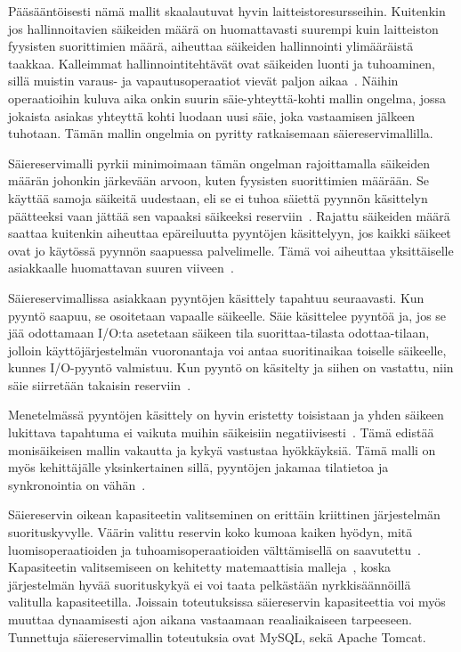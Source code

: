 \documentclass[finnish]{tktltiki2}
\theoremstyle{definition}
\theoremstyle{remark}
\begin{document}
Pääsääntöisesti nämä mallit skaalautuvat hyvin laitteistoresursseihin.
Kuitenkin jos hallinnoitavien säikeiden määrä on huomattavasti suurempi kuin laitteiston
fyysisten suorittimien määrä, aiheuttaa säikeiden hallinnointi ylimääräistä taakkaa.
Kalleimmat hallinnointitehtävät ovat säikeiden luonti ja tuhoaminen, sillä
muistin varaus- ja vapautusoperaatiot vievät paljon aikaa~\cite{ling_analysis_2000}.
Näihin operaatioihin kuluva aika onkin suurin säie-yhteyttä-kohti mallin
ongelma, jossa jokaista asiakas yhteyttä kohti
luodaan uusi säie, joka vastaamisen jälkeen tuhotaan.
Tämän mallin ongelmia on pyritty ratkaisemaan säiereservimallilla.

Säiereservimalli pyrkii minimoimaan tämän ongelman rajoittamalla
säikeiden määrän johonkin järkevään arvoon, kuten fyysisten suorittimien
määrään. Se käyttää samoja säikeitä uudestaan, eli se ei tuhoa säiettä
pyynnön käsittelyn päätteeksi vaan jättää sen vapaaksi säikeeksi reserviin~\cite{ling_analysis_2000}. Rajattu säikeiden määrä saattaa kuitenkin aiheuttaa epäreiluutta
pyyntöjen käsittelyyn, jos kaikki säikeet ovat jo käytössä pyynnön
saapuessa palvelimelle. Tämä voi aiheuttaa yksittäiselle asiakkaalle
huomattavan suuren viiveen~\cite{welsh_seda_2001}.

Säiereservimallissa asiakkaan pyyntöjen käsittely tapahtuu seuraavasti.
Kun pyyntö saapuu, se osoitetaan vapaalle säikeelle. Säie käsittelee pyyntöä ja,
jos se jää odottamaan I/O:ta asetetaan säikeen tila suorittaa-tilasta odottaa-tilaan,
jolloin käyttöjärjestelmän vuoronantaja voi antaa suoritinaikaa toiselle säikeelle,
kunnes I/O-pyyntö valmistuu. Kun pyyntö on käsitelty ja siihen on vastattu, niin
säie siirretään takaisin reserviin~\cite{ling_analysis_2000}.

Menetelmässä pyyntöjen käsittely on hyvin eristetty toisistaan ja
yhden säikeen lukittava tapahtuma ei vaikuta muihin säikeisiin negatiivisesti~\cite{davis_case_2017}.
Tämä edistää monisäikeisen mallin vakautta ja kykyä vastustaa hyökkäyksiä.
Tämä malli on myös kehittäjälle yksinkertainen sillä, pyyntöjen jakamaa tilatietoa
ja synkronointia on vähän~\cite{hu_applying_1998}.

Säiereservin oikean kapasiteetin valitseminen on erittäin kriittinen
järjestelmän suorituskyvylle.
Väärin valittu reservin koko kumoaa kaiken hyödyn, mitä luomisoperaatioiden
ja tuhoamisoperaatioiden välttämisellä on saavutettu~\cite{ling_analysis_2000}.
Kapasiteetin valitsemiseen on kehitetty matemaattisia malleja~\cite{ling_analysis_2000},
koska järjestelmän hyvää suorituskykyä ei voi taata pelkästään nyrkkisäännöillä
valitulla kapasiteetilla.
Joissain toteutuksissa säiereservin kapasiteettia voi myös muuttaa dynaamisesti ajon aikana vastaamaan
reaaliaikaiseen tarpeeseen.
Tunnettuja säiereservimallin toteutuksia ovat MySQL, sekä Apache Tomcat.
\end{document}
